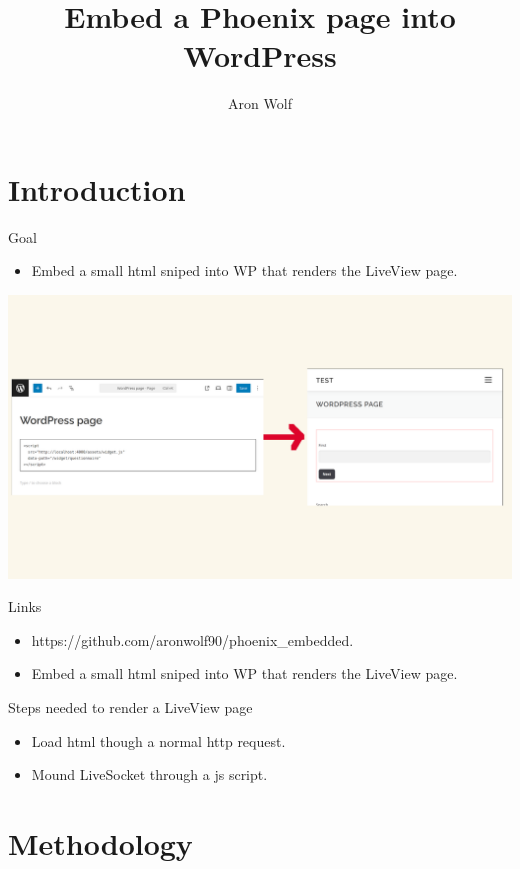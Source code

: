 \documentclass{beamer}
\title[Short Title]{Embed a Phoenix page into WordPress}
\author{Aron Wolf}
\date{}
\begin{document}
\begin{frame}
  \titlepage
\end{frame}

\section{Introduction}

\begin{frame}{Goal}
  \begin{itemize}
    \item Embed a small html sniped into WP that renders the LiveView page.
  \end{itemize}
  \centering
  \includegraphics[width=1\linewidth]{images/goal.png}
\end{frame}

\begin{frame}{Links}
  \begin{itemize}
    \item https://github.com/aronwolf90/phoenix_embedded.
    \item Embed a small html sniped into WP that renders the LiveView page.
  \end{itemize}
\end{frame}

\begin{frame}{Steps needed to render a LiveView page}
  \begin{itemize}
    \item Load html though a normal http request.
    \item Mound LiveSocket through a js script.
  \end{itemize}
\end{frame}

\section{Methodology}
\end{document}
